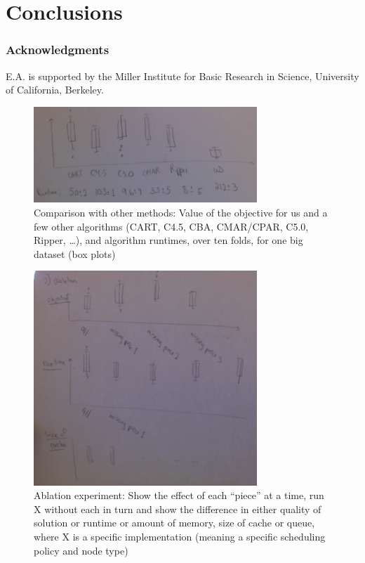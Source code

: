 \section{Conclusions}

\subsubsection*{Acknowledgments}

E.A. is supported by the Miller Institute for Basic Research in Science,
University of California, Berkeley.




\newpage

\begin{figure}[t!]
\begin{center}
\includegraphics[width=0.75\textwidth]{figs/sketch-comparison.png}
\end{center}
\caption{Comparison with other methods:
Value of the objective for us and a few other algorithms
(CART, C4.5, CBA, CMAR/CPAR, C5.0, Ripper, \dots), and algorithm runtimes,
over ten folds, for one big dataset (box plots)}
\label{fig:comparison}
\end{figure}

\begin{figure}[t!]
\begin{center}
\includegraphics[width=0.75\textwidth]{figs/sketch-ablation.png}
\end{center}
\caption{Ablation experiment:
Show the effect of each ``piece'' at a time,
run X without each in turn and show the difference in either
quality of solution or runtime or amount of memory, size of cache or queue,
where X is a specific implementation
(meaning a specific scheduling policy and node type)}
\label{fig:ablation}
\end{figure}

